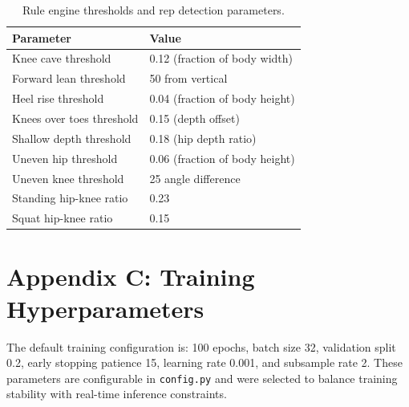 \documentclass[11pt]{article}
\begin{document}
\begin{table}[h]
  \centering
  \small
  \begin{tabular}{ll}
    \toprule
    \textbf{Parameter} & \textbf{Value} \\
    \midrule
    Knee cave threshold & 0.12 (fraction of body width) \\
    Forward lean threshold & 50\textdegree{} from vertical \\
    Heel rise threshold & 0.04 (fraction of body height) \\
    Knees over toes threshold & 0.15 (depth offset) \\
    Shallow depth threshold & 0.18 (hip depth ratio) \\
    Uneven hip threshold & 0.06 (fraction of body height) \\
    Uneven knee threshold & 25\textdegree{} angle difference \\
    Standing hip-knee ratio & 0.23 \\
    Squat hip-knee ratio & 0.15 \\
    \bottomrule
  \end{tabular}
  \caption{Rule engine thresholds and rep detection parameters.}
  \label{tab:thresholds}
\end{table}

\section{Appendix C: Training Hyperparameters}
The default training configuration is: 100 epochs, batch size 32, validation split 0.2, early stopping patience 15, learning rate 0.001, and subsample rate 2. These parameters are configurable in \texttt{config.py} and were selected to balance training stability with real-time inference constraints.
\end{document}
